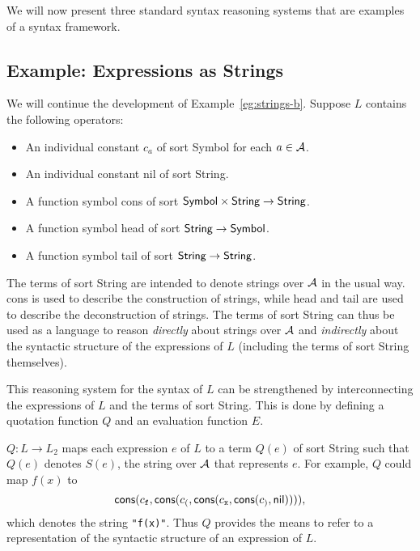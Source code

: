 \documentclass[11pt,fleqn]{article}
\newcommand{\bi}{\begin{itemize}}
\newcommand{\ei}{\end{itemize}}
\newcommand{\sA}{\mbox{$\cal A$}}
\newcommand{\mname}[1]{\mbox{\sf #1}}
\newcommand{\tarrow}{\rightarrow}
\begin{document}
We will now present three standard syntax reasoning systems that are
examples of a syntax framework.

\subsection{Example: Expressions as Strings} \label{subsec:strings}

We will continue the development of Example~\ref{eg:strings-b}.
Suppose $L$ contains the following operators:

\bi

  \item An individual constant $c_a$ of sort \mname{Symbol} for each
    $a \in \sA$.

  \item An individual constant \mname{nil} of sort \mname{String}.

  \item A function symbol \mname{cons} of sort $\mname{Symbol} \times
    \mname{String} \tarrow \mname{String}$.

  \item A function symbol \mname{head} of sort $\mname{String} \tarrow
    \mname{Symbol}$.

  \item A function symbol \mname{tail} of sort $\mname{String} \tarrow
    \mname{String}$.

\ei
The terms of sort \mname{String} are intended to denote strings over
$\sA$ in the usual way.  \mname{cons} is used to describe the
construction of strings, while \mname{head} and \mname{tail} are used
to describe the deconstruction of strings.  The terms of sort
\mname{String} can thus be used as a language to reason
\emph{directly} about strings over $\sA$ and \emph{indirectly} about
the syntactic structure of the expressions of $L$ (including the terms
of sort \mname{String} themselves).

This reasoning system for the syntax of $L$ can be strengthened by
interconnecting the expressions of $L$ and the terms of sort
\mname{String}.  This is done by defining a quotation function $Q$ and
an evaluation function $E$.  

$Q : L \tarrow L_2$ maps each expression $e$ of $L$ to a term $Q(e)$
of sort \mname{String} such that $Q(e)$ denotes $S(e)$, the string
over $\sA$ that represents $e$.  For example, $Q$ could map $f(x)$
to \[\mname{cons}(c_{\tt f}, \mname{cons}(c_{\tt (},
\mname{cons}(c_{\tt x}, \mname{cons}(c_{\tt )}, \mname{nil})))),\]
which denotes the string \texttt{"f(x)"}.  Thus $Q$ provides the means
to refer to a representation of the syntactic structure of an
expression of $L$.
\end{document}
